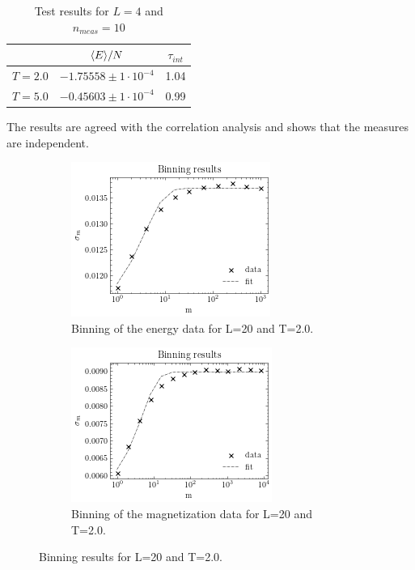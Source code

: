 \documentclass[article]{revtex4}
\newcommand{\qdist}[1]{\ifmmode\langle#1\rangle\else\textlangle#1\textrangle\fi}
\begin{document}
\begin{table}[h!]
\center
\begin{tabular}{|c|c|c|}
\hline
&$\qdist{E}/N $ & $ \tau_{int} $\\
\hline
$T = 2.0$ &$-1.75558 \pm 1 \cdot10^{-4}$&1.04\\
\hline
$T = 5.0$&$-0.45603 \pm 1 \cdot10^{-4}$&0.99\\
\hline
\end{tabular}
\center
\caption{Test results for $L = 4$ and $n_{meas}=10$}
\end{table}
The results are agreed with the correlation analysis and shows that the measures are independent. 
\\
\begin{figure}[h!]
\begin{subfigure}{.5\textwidth}
  \centering
  \includegraphics[width=0.7\linewidth]{binningL20.png}
  \caption{Binning of the energy data for L=20 and T=2.0.}
\end{subfigure}%
\begin{subfigure}{.5\textwidth}
  \centering
  \includegraphics[width=0.7\linewidth]{binningML20.png}
  \caption{Binning of the magnetization data for L=20 and T=2.0.}
\end{subfigure}
\caption{Binning results for L=20 and T=2.0.}
\end{figure}
\\
\\
\end{document}
